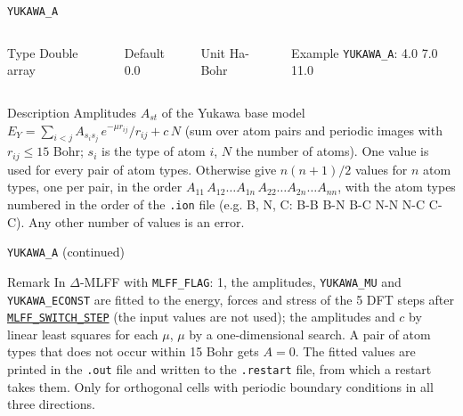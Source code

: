 \begin{frame}[allowframebreaks]{\texttt{{YUKAWA\_A}}} \label{YUKAWA_A}
\vspace*{-12pt}
\begin{columns}
\begin{block}{Type}
Double array
\end{block}

\begin{block}{Default}
0.0
\end{block}

\begin{block}{Unit}
Ha-Bohr
\end{block}

\begin{block}{Example}
\texttt{YUKAWA\_A}: 4.0 7.0 11.0
\end{block}
\end{columns}

\begin{block}{Description}
Amplitudes $A_{st}$ of the Yukawa base model $E_Y = \sum_{i<j} A_{s_i s_j}\, e^{-\mu r_{ij}}/r_{ij} + c\,N$ (sum over atom pairs and periodic images with $r_{ij} \le 15$ Bohr; $s_i$ is the type of atom $i$, $N$ the number of atoms). One value is used for every pair of atom types. Otherwise give $n(n+1)/2$ values for $n$ atom types, one per pair, in the order $A_{11}\, A_{12} \ldots A_{1n}\, A_{22} \ldots A_{2n} \ldots A_{nn}$, with the atom types numbered in the order of the \texttt{.ion} file (e.g. B, N, C: B-B B-N B-C N-N N-C C-C). Any other number of values is an error.
\end{block}

\end{frame}

\begin{frame}[allowframebreaks]{\texttt{{YUKAWA\_A}} (continued)}
\begin{block}{Remark}
In $\Delta$-MLFF with \texttt{MLFF\_FLAG}: 1, the amplitudes, \texttt{YUKAWA\_MU} and \texttt{YUKAWA\_ECONST} are fitted to the energy, forces and stress of the 5 DFT steps after \hyperlink{MLFF_SWITCH_STEP}{\texttt{MLFF\_SWITCH\_STEP}} (the input values are not used); the amplitudes and $c$ by linear least squares for each $\mu$, $\mu$ by a one-dimensional search. A pair of atom types that does not occur within 15 Bohr gets $A = 0$. The fitted values are printed in the \texttt{.out} file and written to the \texttt{.restart} file, from which a restart takes them. Only for orthogonal cells with periodic boundary conditions in all three directions.
\end{block}

\end{frame}

